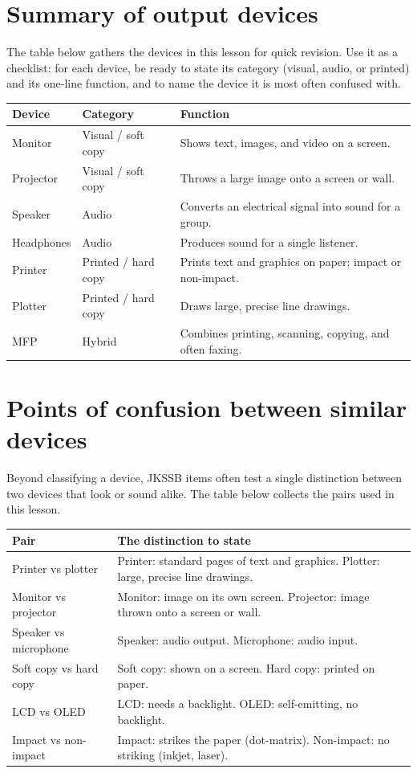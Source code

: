 \documentclass[11pt]{article}
\begin{document}
\section{Summary of output devices}
The table below gathers the devices in this lesson for quick revision. Use it
as a checklist: for each device, be ready to state its category (visual,
audio, or printed) and its one-line function, and to name the device it is
most often confused with.

\begin{center}
\begin{tabular}{p{}p{}p{}}
\toprule
\textbf{Device} & \textbf{Category} & \textbf{Function} \\
\midrule
Monitor & Visual / soft copy & Shows text, images, and video on a screen. \\
Projector & Visual / soft copy & Throws a large image onto a screen or wall. \\
Speaker & Audio & Converts an electrical signal into sound for a group. \\
Headphones & Audio & Produces sound for a single listener. \\
Printer & Printed / hard copy & Prints text and graphics on paper; impact or non-impact. \\
Plotter & Printed / hard copy & Draws large, precise line drawings. \\
MFP & Hybrid & Combines printing, scanning, copying, and often faxing. \\
\bottomrule
\end{tabular}
\end{center}

\section{Points of confusion between similar devices}
Beyond classifying a device, JKSSB items often test a single distinction
between two devices that look or sound alike. The table below collects the
pairs used in this lesson.

\begin{center}
\begin{tabular}{p{}p{}}
\toprule
\textbf{Pair} & \textbf{The distinction to state} \\
\midrule
Printer vs plotter & Printer: standard pages of text and graphics. Plotter: large, precise line drawings. \\
Monitor vs projector & Monitor: image on its own screen. Projector: image thrown onto a screen or wall. \\
Speaker vs microphone & Speaker: audio output. Microphone: audio input. \\
Soft copy vs hard copy & Soft copy: shown on a screen. Hard copy: printed on paper. \\
LCD vs OLED & LCD: needs a backlight. OLED: self-emitting, no backlight. \\
Impact vs non-impact & Impact: strikes the paper (dot-matrix). Non-impact: no striking (inkjet, laser). \\
\bottomrule
\end{tabular}
\end{center}
\end{document}
